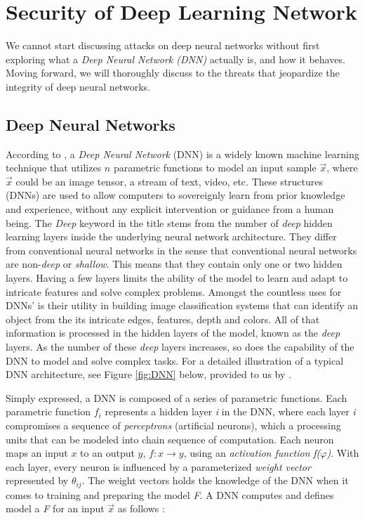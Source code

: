 \documentclass[grad,lot,lof,11pt,oneside,onehalfspace]{RUthesis}
\begin{document}
 \section{Security of Deep Learning Network}
 We cannot start discussing attacks on deep neural networks without first exploring what a \textit{Deep Neural Network (DNN)} actually is, and how it behaves. Moving forward, we will thoroughly discuss to the threats that jeopardize the integrity of deep neural networks.
 
\subsection{Deep Neural Networks}
According to \cite{papernot_practical_2017}, a \textit{Deep Neural Network} (DNN) is a widely known machine learning technique that utilizes $n$ parametric functions to model an input sample $\vec{x}$, where $\vec{x}$ could be an image tensor,  a stream of text, video, etc. These structures (DNNs) are used to allow computers to sovereignly learn from prior knowledge and experience, without any explicit intervention or guidance from a human being. The \textit{Deep} keyword in the title stems from the number of \textit{deep} hidden learning layers inside the underlying neural network architecture. They differ from conventional neural networks in the sense that conventional neural networks are non-\textit{deep} or \textit{shallow}. This means that they contain only one or two  hidden layers. Having a few layers limits the ability of the model to learn and adapt to intricate features and solve complex problems. Amongst the countless uses for DNNs' is their utility in building image classification systems that can identify an object from the its intricate edges, features, depth and colors. All of that information is processed in the hidden layers of the model, known as the \textit{deep} layers. As the number of these \textit{deep} layers increases, so does the capability of the DNN to model and solve complex tasks. For a detailed illustration of a typical DNN architecture, see Figure \ref{fig:DNN} below, provided  to us by \cite{papernot_practical_2017}.

Simply expressed, a DNN is composed  of a series of parametric functions. Each parametric function \textit{$f_{i}$} represents a hidden layer \textit{i} in the DNN, where each layer \textit{i} compromises a sequence of \textit{perceptrons} (artificial neurons), which a processing units that can be modeled into chain sequence of computation. Each neuron maps an input $x$ to an output $y$, \textit{$f:x\longrightarrow y $}, using an \textit{activation function}  \textit{f($\varphi$)}. With each layer, every neuron is influenced by a parameterized \textit{weight vector} represented by $\theta_{ij}$. The weight vectors holds the knowledge of the DNN when it comes to training and preparing the model \textit{F}. A DNN computes and defines model a \textit{F} for an input $\vec{x}$ as follows \cite{papernot_practical_2017}:
\end{document}
